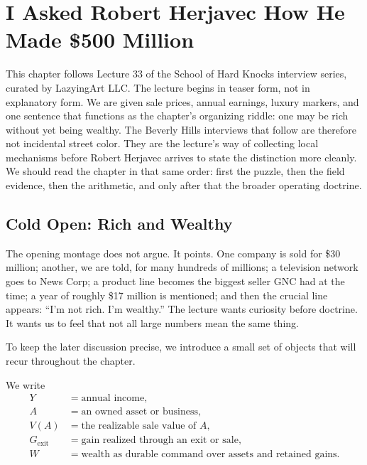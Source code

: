 \chapter{I Asked Robert Herjavec How He Made \$500 Million}

This chapter follows Lecture 33 of the School of Hard Knocks interview series, curated by LazyingArt LLC. The lecture begins in teaser form, not in explanatory form. We are given sale prices, annual earnings, luxury markers, and one sentence that functions as the chapter's organizing riddle: one may be rich without yet being wealthy. The Beverly Hills interviews that follow are therefore not incidental street color. They are the lecture's way of collecting local mechanisms before Robert Herjavec arrives to state the distinction more cleanly. We should read the chapter in that same order: first the puzzle, then the field evidence, then the arithmetic, and only after that the broader operating doctrine.

\section{Cold Open: Rich and Wealthy}

The opening montage does not argue. It points. One company is sold for \$30 million; another, we are told, for many hundreds of millions; a television network goes to News Corp; a product line becomes the biggest seller GNC had at the time; a year of roughly \$17 million is mentioned; and then the crucial line appears: ``I'm not rich. I'm wealthy.'' The lecture wants curiosity before doctrine. It wants us to feel that not all large numbers mean the same thing.

To keep the later discussion precise, we introduce a small set of objects that will recur throughout the chapter.

\begin{definition}
We write
\begin{align}
Y &= \text{annual income},\\
A &= \text{an owned asset or business},\\
V(A) &= \text{the realizable sale value of }A,\\
G_{\mathrm{exit}} &= \text{gain realized through an exit or sale},\\
W &= \text{wealth as durable command over assets and retained gains}.
\end{align}
\end{definition}

